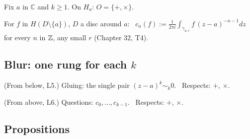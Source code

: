 \begin{lines}
\item[\lab{D1}] Fix $a$ in $\mathbb{C}$ and $k \ge 1$. On $H_a$: $O = \{+, \times\}$.
\item[\lab{D2}] For $f$ in $H(D \setminus \{a\})$, $D$ a disc around $a$: \ $c_n(f) := \frac{1}{2\pi i}\int_{\gamma_{a,r}} f\,(z - a)^{-n-1}dz$ for every $n$ in $\mathbb{Z}$, any small $r$ (Chapter 32, T4).
\end{lines}

\subsection*{Blur: one rung for each $k$}

\begin{lines}
\item[\lab{B1}] (From below, L5.) Gluing: the single pair $(z - a)^k \sim_k 0$. \ Respects: $+$, $\times$.
\item[\lab{B2}] (From above, L6.) Questions: $c_0, \dots, c_{k-1}$. \ Respects: $+$, $\times$.
\end{lines}

\subsection*{Propositions}

